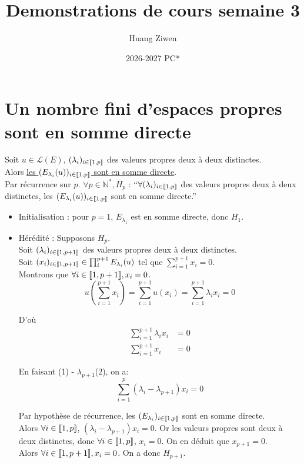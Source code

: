 \documentclass[]{article}
\title{Demonstrations de cours semaine 3}
\author{Huang Ziwen}
\date{2026-2027 PC*}
\begin{document}
\section{Un nombre fini d'espaces propres sont en somme directe}

Soit $u \in \mathcal{L}(E)$, $(\lambda_i)_{i \in \llbracket {1}, {p} \rrbracket}$ des valeurs propres deux à deux distinctes. \\

Alors \underline{les $(E_{\lambda_i}(u))_{i \in \llbracket {1}, {p} \rrbracket}$ sont en somme directe}. \\

Par récurrence sur $p$. $\forall p \in \mathbb{N}^*, H_p$ : ``$\forall (\lambda_i)_{i \in \llbracket {1}, {p} \rrbracket}$ des valeurs propres deux à deux distinctes, les $(E_{\lambda_i}(u))_{i \in \llbracket {1}, {p} \rrbracket}$ sont en somme directe.''

\begin{itemize}
    \item Initialisation : pour $p = 1$, $E_{\lambda_1}$ est en somme directe, donc $H_1$. 
    \item Hérédité : Supposons $H_p$. \\
    
    Soit $(\lambda_i)_{i \in \llbracket {1}, {p+1} \rrbracket}$ des valeurs propres deux à deux distinctes. \\
    Soit $(x_i)_{i \in \llbracket {1}, {p+1} \rrbracket} \in \prod_{i}^{p+1}E_{\lambda_i}(u)$ tel que $\sum_{i=1}^{p+1} x_i = 0$. \\
    
    Montrons que $\forall i \in \llbracket {1}, {p+1} \rrbracket, x_i = 0$. \\

    \[ u(\sum_{i=1}^{p+1} x_i) = \sum_{i=1}^{p+1} u(x_i) = \sum_{i=1}^{p+1} \lambda_i x_i = 0 \]

    D'où \begin{align}
        \sum_{i=1}^{p+1} \lambda_i x_i &= 0 \\
        \sum_{i=1}^{p+1} x_i &= 0
    \end{align}

    En faisant (1) - $\lambda_{p+1}$(2), on a:
    \[ \sum_{i=1}^{p} (\lambda_i - \lambda_{p+1})x_i = 0 \]

    Par hypothèse de récurrence, les $(E_{\lambda_i})_{i \in \llbracket {1}, {p} \rrbracket}$ sont en somme directe. \\
    
    Alors $\forall i \in \llbracket {1}, {p} \rrbracket$, $(\lambda_i - \lambda_{p+1})x_i = 0$. Or les valeurs propres sont deux à deux distinctes, donc $\forall i \in \llbracket {1}, {p} \rrbracket$, $x_i = 0$. On en déduit que $x_{p+1} = 0$. \\

    Alors $\forall i \in \llbracket {1}, {p+1} \rrbracket, x_i = 0$. On a donc $H_{p+1}$. 
\end{itemize}
\end{document}
